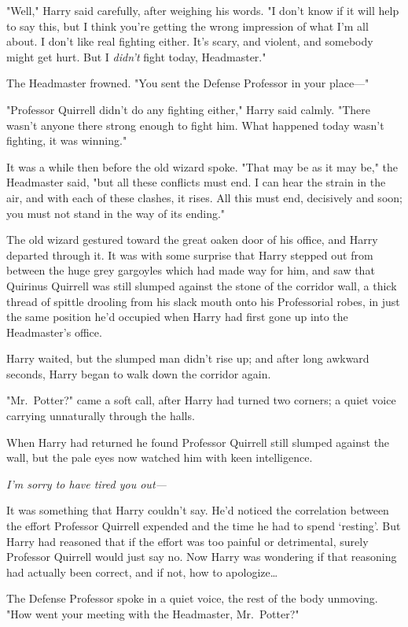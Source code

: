 "Well," Harry said carefully, after weighing his words. "I don't know if it
will help to say this, but I think you're getting the wrong impression of what
I'm all about. I don't like real fighting either. It's scary, and violent, and
somebody might get hurt. But I \emph{didn't} fight today, Headmaster."

The Headmaster frowned. "You sent the Defense Professor in your place---"

"Professor Quirrell didn't do any fighting either," Harry said calmly. "There
wasn't anyone there strong enough to fight him. What happened today wasn't
fighting, it was winning."

It was a while then before the old wizard spoke. "That may be as it may be,"
the Headmaster said, "but all these conflicts must end. I can hear the strain
in the air, and with each of these clashes, it rises. All this must end,
decisively and soon; you must not stand in the way of its ending."

The old wizard gestured toward the great oaken door of his office, and Harry
departed through it.
\later
It was with some surprise that Harry stepped out from between the huge grey
gargoyles which had made way for him, and saw that Quirinus Quirrell was still
slumped against the stone of the corridor wall, a thick thread of spittle
drooling from his slack mouth onto his Professorial robes, in just the same
position he'd occupied when Harry had first gone up into the Headmaster's
office.

Harry waited, but the slumped man didn't rise up; and after long awkward
seconds, Harry began to walk down the corridor again.

"Mr.~Potter?" came a soft call, after Harry had turned two corners; a quiet
voice carrying unnaturally through the halls.

When Harry had returned he found Professor Quirrell still slumped against the
wall, but the pale eyes now watched him with keen intelligence.

\emph{I'm sorry to have tired you out---}

It was something that Harry couldn't say. He'd noticed the correlation between
the effort Professor Quirrell expended and the time he had to spend `resting'.
But Harry had reasoned that if the effort was too painful or detrimental,
surely Professor Quirrell would just say no. Now Harry was wondering if that
reasoning had actually been correct, and if not, how to apologize{\ldots}

The Defense Professor spoke in a quiet voice, the rest of the body unmoving.
"How went your meeting with the Headmaster, Mr.~Potter?"

